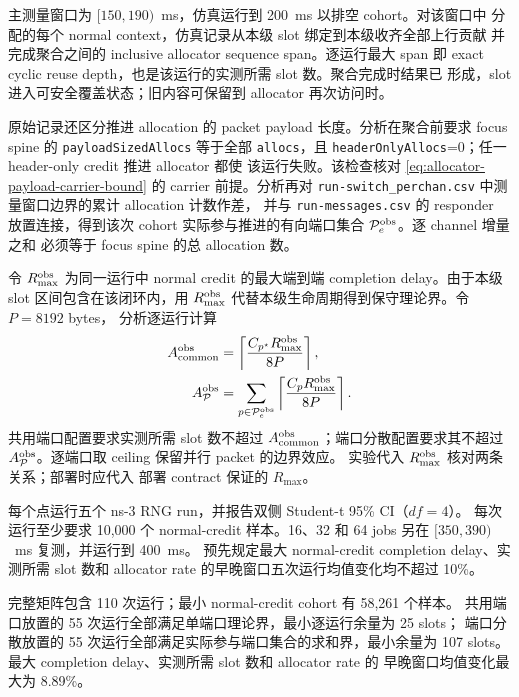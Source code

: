主测量窗口为 $[150,190)$~ms，仿真运行到 200~ms 以排空 cohort。对该窗口中
分配的每个 normal context，仿真记录从本级 slot 绑定到本级收齐全部上行贡献
并完成聚合之间的 inclusive allocator sequence span。逐运行最大 span 即
exact cyclic reuse depth，也是该运行的实测所需 slot 数。聚合完成时结果已
形成，slot 进入可安全覆盖状态；旧内容可保留到 allocator 再次访问时。

原始记录还区分推进 allocation 的 packet payload 长度。分析在聚合前要求
focus spine 的 \texttt{payloadSizedAllocs} 等于全部 \texttt{allocs}，且
\texttt{headerOnlyAllocs}=0；任一 header-only credit 推进 allocator 都使
该运行失败。该检查核对
\cref{eq:allocator-payload-carrier-bound} 的 carrier 前提。分析再对
\texttt{run-switch\_perchan.csv} 中测量窗口边界的累计 allocation 计数作差，
并与 \texttt{run-messages.csv} 的 responder 放置连接，得到该次 cohort
实际参与推进的有向端口集合 $\mathcal P_e^{\rm obs}$。逐 channel 增量之和
必须等于 focus spine 的总 allocation 数。

令 $R_{\max}^{\rm obs}$ 为同一运行中 normal credit 的最大端到端 completion
delay。由于本级 slot 区间包含在该闭环内，用
$R_{\max}^{\rm obs}$ 代替本级生命周期得到保守理论界。令 $P=8192$ bytes，
分析逐运行计算
\begin{align}
A_{\rm common}^{\rm obs}
  &=\left\lceil\frac{C_{p^\star}R_{\max}^{\rm obs}}{8P}\right\rceil,\\
A_{\mathcal P}^{\rm obs}
  &=\sum_{p\in\mathcal P_e^{\rm obs}}
    \left\lceil\frac{C_pR_{\max}^{\rm obs}}{8P}\right\rceil .
\end{align}
共用端口配置要求实测所需 slot 数不超过
$A_{\rm common}^{\rm obs}$；端口分散配置要求其不超过
$A_{\mathcal P}^{\rm obs}$。逐端口取 ceiling 保留并行 packet 的边界效应。
实验代入 $R_{\max}^{\rm obs}$ 核对两条关系；部署时应代入
部署 contract 保证的 $R_{\max}$。

每个点运行五个 ns-3 RNG run，并报告双侧 Student-t 95\% CI（$df=4$）。
每次运行至少要求 10,000 个 normal-credit 样本。16、32 和 64 jobs 另在
$[350,390)$~ms 复测，并运行到 400~ms。
预先规定最大 normal-credit completion delay、实测所需 slot 数和 allocator
rate 的早晚窗口五次运行均值变化均不超过 10\%。

完整矩阵包含 110 次运行；最小 normal-credit cohort 有 58,261 个样本。
共用端口放置的 55 次运行全部满足单端口理论界，最小逐运行余量为 25 slots；
端口分散放置的 55 次运行全部满足实际参与端口集合的求和界，最小余量为
107 slots。最大 completion delay、实测所需 slot 数和 allocator rate 的
早晚窗口均值变化最大为 8.89\%。

